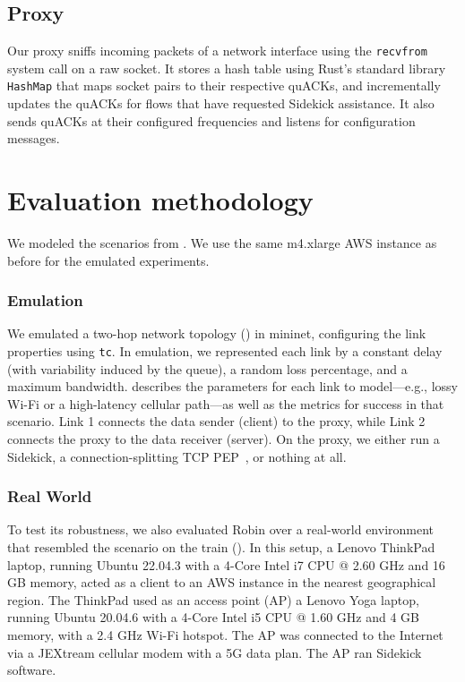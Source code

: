 \subsection{Proxy}
\label{sec:sidekick:implementation:proxy}

Our proxy sniffs incoming packets of a network interface using the
\texttt{recvfrom} system call on a raw socket.
It stores a hash table using Rust's standard library \texttt{HashMap} that maps
socket pairs to their respective quACKs, and
incrementally updates the quACKs for flows that have requested Sidekick assistance.
It also sends quACKs at their configured frequencies and listens for
configuration messages.

\section{Evaluation methodology}
\label{sec:sidekick:evaluation:methodology}

We modeled the scenarios from . We use the same
m4.xlarge AWS instance as before for the emulated experiments.

\subsubsection{Emulation}

We emulated a two-hop network topology () in mininet,
configuring the link properties using \texttt{tc}.
In emulation, we represented
each link by a constant delay (with variability induced by the queue), a random
loss percentage, and a maximum bandwidth.
 describes the parameters
for each link to model---e.g., lossy Wi-Fi or a high-latency cellular
path---as well as the metrics for success in that scenario.
Link 1 connects the data sender (client) to the proxy,
while Link 2 connects the proxy to the data receiver (server).
On the proxy, we either run a Sidekick,
a connection-splitting TCP PEP~\cite{caini2006pepsal}, or nothing at all.

\subsubsection{Real World}

To test its robustness, we also evaluated Robin over a real-world
environment that resembled the scenario on the train ().
In this setup, a Lenovo ThinkPad laptop, running Ubuntu 22.04.3 with a 4-Core
Intel i7 CPU @ 2.60 GHz and 16 GB memory, acted as a client to an AWS instance in
the nearest geographical region. The ThinkPad used as an access point (AP)
a Lenovo Yoga laptop, running Ubuntu 20.04.6 with a 4-Core Intel i5 CPU @
1.60 GHz and 4 GB memory, with a 2.4 GHz Wi-Fi hotspot.
The AP was connected to the Internet via a JEXtream cellular modem
with a 5G data plan. The AP ran Sidekick software.

